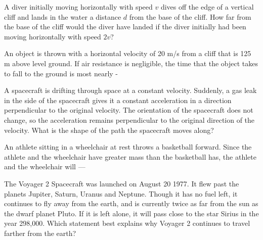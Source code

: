 \documentclass[10pt]{examdesign}
\begin{document}
\begin{multiplechoice} [title={Multiple Choice},
	rearrange=yes]
\begin{question}
	A diver initially moving horizontally with speed $v$ dives off the edge of a vertical cliff and lands in the water a distance $d$ from the base of the cliff. How far from the base of the cliff would the diver have landed if the diver  initially had been moving horizontally with speed $2v$?
\end{question}

\begin{question} An object is thrown with a horizontal velocity of 20 m/s from a cliff that is 125 m above level ground.  If air resistance is negligible, the time that the object takes to fall to the ground is most nearly - 
\end{question}


\begin{question}
A spacecraft is drifting through space at a constant velocity.  Suddenly, a gas leak in the side of the spacecraft gives it a constant acceleration in a direction perpendicular to the original velocity.  The orientation of the spacecraft does not change, so the acceleration remains perpendicular to the original direction of the velocity.  What is the shape of the path the spacecraft moves along?  
\end{question}

\begin{question}
	An athlete sitting in a wheelchair at rest throws a basketball forward. Since the athlete and the wheelchair have greater mass than the basketball has, the athlete and the wheelchair will — 
\end{question}


\begin{question}
	The Voyager 2 Spacecraft was launched on August 20 1977.  It flew past the planets Jupiter, Saturn, Uranus and Neptune.  Though it has no fuel left, it continues to fly away from the earth, and is currently twice as far from the sun as the dwarf planet Pluto.  If it is left alone, it will pass close to the star Sirius in the year 298,000.  Which statement best explains why Voyager 2 continues to travel farther from the earth?
\end{question}


\end{multiplechoice}
\end{document}
